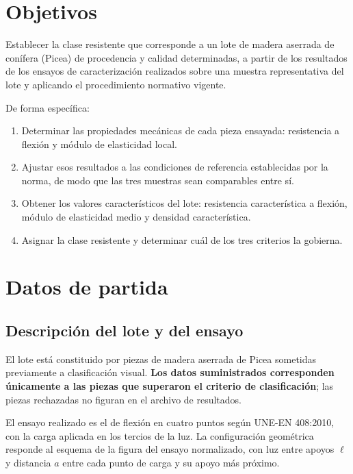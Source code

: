 \documentclass[11pt,a4paper]{article}
\begin{document}
\section{Objetivos}
Establecer la clase resistente que corresponde a un lote de madera aserrada de
conífera (Picea) de procedencia y calidad determinadas, a partir de los resultados
de los ensayos de caracterización realizados sobre una muestra representativa del
lote y aplicando el procedimiento normativo vigente.

De forma específica:

\begin{enumerate}
  \item Determinar las propiedades mecánicas de cada pieza ensayada: resistencia a
        flexión y módulo de elasticidad local.
  \item Ajustar esos resultados a las condiciones de referencia establecidas por la
        norma, de modo que las tres muestras sean comparables entre sí.
  \item Obtener los valores característicos del lote: resistencia característica a
        flexión, módulo de elasticidad medio y densidad característica.
  \item Asignar la clase resistente y determinar cuál de los tres criterios la
        gobierna.
\end{enumerate}

\section{Datos de partida}

\subsection{Descripción del lote y del ensayo}

El lote está constituido por piezas de madera aserrada de Picea sometidas
previamente a clasificación visual. \textbf{Los datos suministrados corresponden
únicamente a las piezas que superaron el criterio de clasificación}; las piezas
rechazadas no figuran en el archivo de resultados.

El ensayo realizado es el de flexión en cuatro puntos según UNE-EN 408:2010, con la
carga aplicada en los tercios de la luz. La configuración geométrica responde al
esquema de la figura del ensayo normalizado, con luz entre apoyos $\ell$ y distancia
$a$ entre cada punto de carga y su apoyo más próximo.
\end{document}
